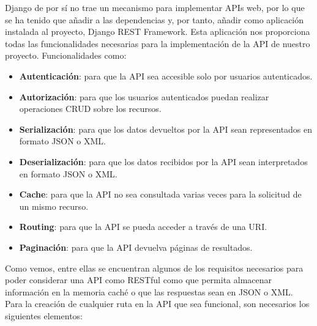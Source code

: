 Django de por sí no trae un mecanismo para implementar APIs web, por lo que se ha tenido
que añadir a las dependencias y, por tanto, añadir como aplicación instalada al proyecto,
Django REST Framework. Esta aplicación nos proporciona todas las funcionalidades
necesarias para la implementación de la API de nuestro proyecto. Funcionalidades como:

    \begin{itemize}
        \item \textbf{Autenticación}: para que la API sea accesible solo por usuarios
        autenticados.
        \item \textbf{Autorización}: para que los usuarios autenticados puedan realizar
        operaciones CRUD sobre los recursos.
        \item \textbf{Serialización}: para que los datos devueltos por la API sean
        representados en formato JSON o XML.
        \item \textbf{Deserialización}: para que los datos recibidos por la API sean
        interpretados en formato JSON o XML.
        \item \textbf{Cache}: para que la API no sea consultada varias veces para la
        solicitud de un mismo recurso.
        \item \textbf{Routing}: para que la API se pueda acceder a través de una URI.
        \item \textbf{Paginación}: para que la API devuelva páginas de resultados.
    \end{itemize}

Como vemos, entre ellas se encuentran algunos de los requisitos necesarios para poder
considerar una API como RESTful como que permita almacenar información en la memoria
caché o que las respuestas sean en JSON o XML.\\

Para la creación de cualquier ruta en la API que sea funcional, son necesarios los
siguientes elementos:

